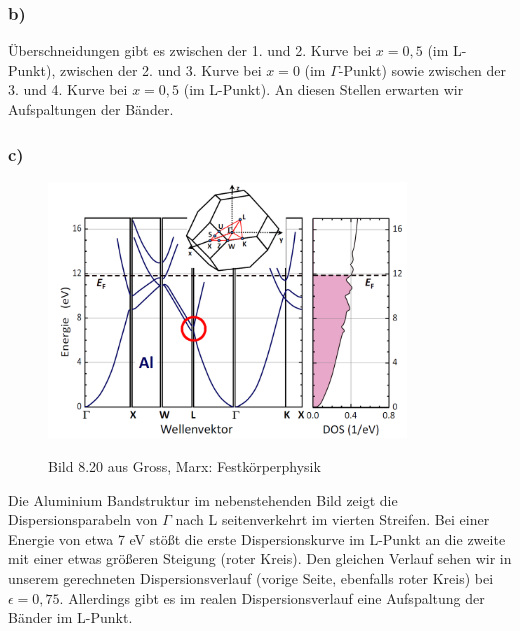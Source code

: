\subsubsection*{b)}
Überschneidungen gibt es zwischen der 1. und 2. Kurve bei $x = 0,5$ (im L-Punkt),
zwischen der 2. und 3. Kurve bei $x = 0$ (im $\Gamma$-Punkt) sowie zwischen
der 3. und 4. Kurve bei $x = 0,5$ (im L-Punkt).
An diesen Stellen erwarten wir Aufspaltungen der Bänder.
\newline
\newpage

\subsubsection*{c)}
\begin{figure}
  \centering
  \includegraphics[width=9.5cm]{aufgabe15c.png}
\label{bild15c}
\caption{Bild 8.20 aus Gross, Marx: Festkörperphysik}
\end{figure}
Die Aluminium Bandstruktur im nebenstehenden Bild zeigt die Dispersionsparabeln
von $\Gamma$ nach L seitenverkehrt im vierten Streifen. Bei einer Energie von etwa 7 eV
stößt die erste Dispersionskurve im L-Punkt an die zweite mit einer etwas größeren
Steigung (roter Kreis). Den gleichen Verlauf sehen wir in unserem
gerechneten Dispersionsverlauf (vorige Seite, ebenfalls roter Kreis) bei $\epsilon = 0,75$.
Allerdings gibt es im realen Dispersionsverlauf eine Aufspaltung der Bänder
im L-Punkt.
\newline

